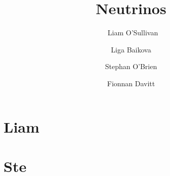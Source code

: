 \documentclass[10pt]{report}
\title{Neutrinos}
\author{\
    Liam O'Sullivan \and
    Liga Baikova \and
    Stephan O'Brien \and
    Fionnan Davitt
}
\begin{document}
\maketitle

\tableofcontents

\chapter{Liam}


\chapter{Ste}





\end{document}
